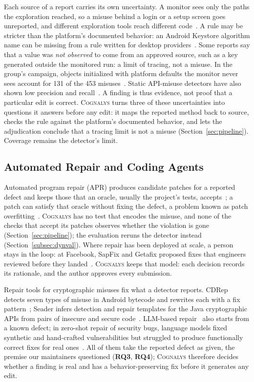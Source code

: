 \documentclass[conference]{IEEEtran}
\newcommand{\system}{\textsc{Cognalys}}
\newcommand{\researchq}[1]{\textbf{RQ#1}}
\begin{document}
Each source of a report carries its own uncertainty. A monitor sees only the
paths the exploration reached, so a misuse behind a login or a setup screen
goes unreported, and different exploration tools reach different code~\cite{costa2026effectiveness}. A rule
may be stricter than the platform's documented behavior: an Android Keystore
algorithm name can be missing from a rule written for desktop providers~\cite{costa2026effectiveness}. Some
reports say that a value was \emph{not observed} to come from an approved
source, such as a key generated outside the monitored run: a limit of tracing,
not a misuse. In the group's campaign, objects initialized with platform
defaults the monitor never sees account for 131 of the 453
misuses~\cite{costa2026effectiveness}. Static API-misuse detectors have also shown low
precision and recall~\cite{amann2019evaluation}. A finding is thus evidence, not proof that a
particular edit is correct.
\system{} turns three of these uncertainties into questions it answers before
any edit: it maps the reported method back to source, checks the rule against
the platform's documented behavior, and lets the adjudication conclude that a
tracing limit is not a misuse (Section~\ref{sec:pipeline}). Coverage remains
the detector's limit.

\subsection{Automated Repair and Coding Agents}
\label{subsec:apr}

Automated program repair (APR) produces candidate patches for a reported
defect and keeps those that an oracle, usually the project's tests,
accepts~\cite{legoues2019apr}; a patch can satisfy that oracle without fixing
the defect, a problem known as patch
overfitting~\cite{smith2015overfitting}. \system{} has no test that encodes
the misuse, and none of the checks that accept its patches observes whether
the violation is gone (Section~\ref{sec:pipeline}); the evaluation reruns the
detector instead (Section~\ref{subsec:dynval}). Where repair
has been deployed at scale, a person stays in the loop: at Facebook, SapFix
and Getafix proposed fixes that engineers reviewed before they
landed~\cite{marginean2019sapfix,bader2019getafix}. \system{} keeps that
model: each decision records its rationale, and the author approves every
submission.

Repair tools for cryptographic misuses fix what a detector reports. CDRep
detects seven types of misuse in Android bytecode and rewrites each with a fix
pattern~\cite{ma2016cdrep}; Seader infers detection and repair templates for
the Java cryptographic APIs from pairs of insecure and secure
code~\cite{zhang2022seader}. LLM-based repair~\cite{xia2023apr,zhang2023apimisuse}
also starts from a known defect; in zero-shot repair of security bugs, language
models fixed synthetic and hand-crafted vulnerabilities but struggled to
produce functionally correct fixes for real ones~\cite{pearce2023zeroshot}.
All of them take the reported defect as given, the premise our maintainers
questioned (\researchq{3}, \researchq{4}); \system{} therefore decides whether
a finding is real and has a behavior-preserving fix before it generates any
edit.
\end{document}

